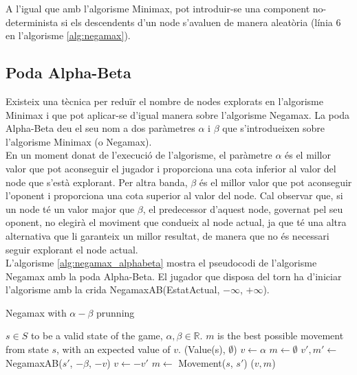 \documentclass[12pt,a4paper]{article}
\begin{document}
A l'igual que amb l'algorisme Minimax, pot introduir-se una component no-determinista si els descendents d'un node s'avaluen de manera aleatòria (línia 6 en l'algorisme \ref{alg:negamax}).\\

\subsection{Poda Alpha-Beta}
Existeix una tècnica per reduïr el nombre de nodes explorats en l'algorisme Minimax\cite{richards1961alpha} i que pot aplicar-se d'igual manera sobre l'algorisme Negamax\cite{knuth1976analysis}. La poda Alpha-Beta deu el seu nom a dos paràmetres $\alpha$ i $\beta$ que s'introdueixen sobre l'algorisme Minimax (o Negamax). \\

En un moment donat de l'execució de l'algorisme, el paràmetre $\alpha$ és el millor valor que pot aconseguir el jugador i proporciona una cota inferior al valor del node que s'està explorant. Per altra banda, $\beta$ és el millor valor que pot aconseguir l'oponent i proporciona una cota superior al valor del node. Cal observar que, si un node té un valor major que $\beta$, el predecessor d'aquest node, governat pel seu oponent, no elegirà el moviment que condueix al node actual, ja que té una altra alternativa que li garanteix un millor resultat, de manera que no és necessari seguir explorant el node actual.\\

L'algorisme \ref{alg:negamax_alphabeta} mostra el pseudocodi de l'algorisme Negamax amb la poda Alpha-Beta. El jugador que disposa del torn ha d'iniciar l'algorisme amb la crida NegamaxAB(EstatActual, $-\infty$, $+\infty$).

\begin{algorithm}[H]
\caption{Negamax with $\alpha-\beta$ prunning}
\label{alg:negamax_alphabeta}
\begin{algorithmic}[5]
\Require $s \in S$ to be a valid state of the game, $\alpha,\beta \in \mathbb{R}$.
\Ensure $m$ is the best possible movement from state $s$, with an expected value of $v$. 
	\State \Return (Value(s), $\emptyset$)
\Else
	\State $v \leftarrow \alpha$
	\State $m \leftarrow \emptyset$
		\State $v',m' \leftarrow$ NegamaxAB($s'$, $-\beta$, $-v$)
			\State $v \leftarrow -v'$
			\State $m \leftarrow$ Movement($s$, $s'$)
		\EndIf
	\EndFor
	\State \Return ($v, m$)
\EndIf
\end{algorithmic}
\end{algorithm}
\end{document}
